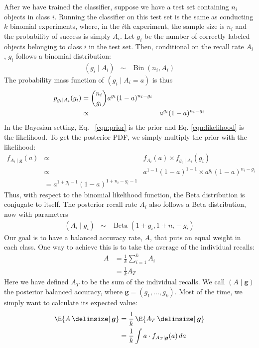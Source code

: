 \documentclass[fleqn,10pt,lineno]{wlpeerj} %
\DeclareMathOperator{\Beta}{Beta}
\DeclareMathOperator{\Bin}{Bin}
\providecommand\given{}
\renewcommand\given{  \nonscript\:
		\delimsize\vert
		\nonscript\:
		\mathopen{}
		\allowbreak}
\renewcommand\given{  \nonscript\:
		\delimsize\vert
		\nonscript\:
		\mathopen{}
		\allowbreak}
\begin{document}
After we have trained the classifier, suppose we have a test set containing
$n_i$ objects in class $i$. Running the classifier on this test set is the same
as conducting $k$ binomial experiments, where, in the $i$th experiment, the
sample size is $n_i$ and the probability of success is simply $A_i$. Let $g_i$
be the number of correctly labeled objects belonging to class $i$ in the test
set. Then, conditional on the recall rate $A_i$, $g_i$ follows a binomial
distribution:
	\begin{align}
		(g_i \mid A_i) &\sim& \Bin(n_i, A_i)
	\end{align}
The probability mass function of $(g_i \mid A_i = a)$ is thus
    \begin{align}
		p_{g_i \mid A_i}(g_i) &= \binom{n_i}{g_i} a^{g_i} (1 - a)^{n_i - g_i}
						  							\label{eqn:likelihood} \\
                              &\propto& a^{g_i} (1 - a)^{n_i - g_i} \notag
    \end{align}
In the Bayesian  setting, Eq. ~\eqref{eqn:prior} is the prior
and Eq. \eqref{eqn:likelihood} is the likelihood. To get the posterior PDF, we
simply multiply the prior with the likelihood:
	\begin{align}
		f_{A_i \mid \bm{g}}(a)
		&\propto& f_{A_i}(a) \times f_{g_i \mid A_i}(g_i) \\
		&\propto& a^{1-1}(1-a)^{1-1} \times a^{g_i} (1 - a)^{n_i - g_i} \\
		&= a^{1 + g_i - 1}(1-a)^{1 + n_i - g_i - 1}
	\end{align}
Thus, with respect to the binomial likelihood function,
the Beta distribution is conjugate to itself. The posterior recall rate $A_i$
also follows a Beta distribution, now with parameters
	\begin{align}
		(A_i \mid g_i) &\sim& \Beta(1 + g_i, 1 + n_i - g_i)
	\end{align}
Our goal is to have a balanced accuracy rate, $A$, that puts an equal weight in
each class. One way to achieve this is to take the average of the individual
recalls:
	\begin{align}
		A &= \frac{1}{k} \sum_{i=1}^k A_i \\
		&= \frac{1}{k} A_T
	\end{align}
Here we have defined $A_T$ to be the sum of the individual recalls. We call $(A
\mid \bm{g})$ the posterior balanced accuracy, where $\bm{g} =(g_1,...,g_k)$.
Most of the time, we simply want to calculate its expected value:
	\begin{align}
		\E{A \given \bm{g}} &= \frac{1}{k} \, \E{A_T \given \bm{g}} \\
		&= \frac{1}{k} \int a \cdot f_{A_T \mid \bm{g}}(a) \, da
	\end{align}
\end{document}
